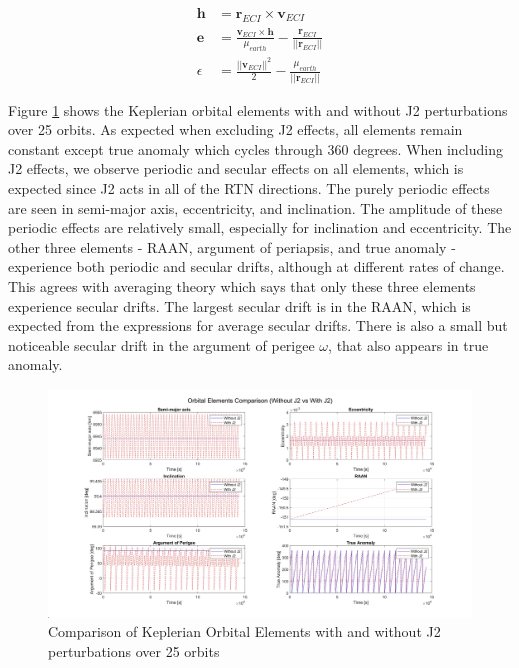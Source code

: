 \begin{align}
    \boldsymbol{h} &= \boldsymbol{r}_{ECI} \times \boldsymbol{v}_{ECI} \\
    \boldsymbol{e} &= \frac{\boldsymbol{v}_{ECI} \times \boldsymbol{h}}{\mu_{earth}} - \frac{\boldsymbol{r}_{ECI}}{||\boldsymbol{r}_{ECI}||} \\
    \epsilon &= \frac{||\boldsymbol{v}_{ECI}||^2}{2} - \frac{\mu_{earth}}{||\boldsymbol{r}_{ECI}||}
\end{align}

Figure \ref{fig:j2_oe_comparison} shows the Keplerian orbital elements with and without J2 perturbations over 25 orbits. As expected when excluding J2 effects, all elements remain constant except true anomaly which cycles through 360 degrees. When including J2 effects, we observe periodic and secular effects on all elements, which is expected since J2 acts in all of the RTN directions. The purely periodic effects are seen in semi-major axis, eccentricity, and inclination. The amplitude of these periodic effects are relatively small, especially for inclination and eccentricity. The other three elements - RAAN, argument of periapsis, and true anomaly - experience both periodic and secular drifts, although at different rates of change. This agrees with averaging theory which says that only these three elements experience secular drifts. The largest secular drift is in the RAAN, which is expected from the expressions for average secular drifts. There is also a small but noticeable secular drift in the argument of perigee $\omega$, that also appears in true anomaly. 

\begin{figure}[H]
    \centering
    \includegraphics[width=1.1\linewidth]{PS1/Figures/OE_J2_Comparison.jpg}
    \caption{Comparison of Keplerian Orbital Elements with and without J2 perturbations over 25 orbits}
    \label{fig:j2_oe_comparison}
\end{figure}

